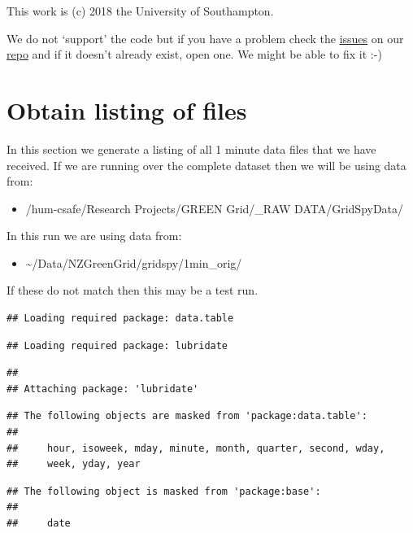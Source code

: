 \documentclass[]{article}
\providecommand{\tightlist}{%
  \setlength{\itemsep}{0pt}\setlength{\parskip}{0pt}}
\begin{document}
This work is (c) 2018 the University of Southampton.

We do not `support' the code but if you have a problem check the
\href{https://git.soton.ac.uk/ba1e12/nzGREENGrid/issues}{issues} on our
\href{https://git.soton.ac.uk/ba1e12/nzGREENGrid}{repo} and if it
doesn't already exist, open one. We might be able to fix it :-)

\section{Obtain listing of files}\label{obtain-listing-of-files}

In this section we generate a listing of all 1 minute data files that we
have received. If we are running over the complete dataset then we will
be using data from:

\begin{itemize}
\tightlist
\item
  /hum-csafe/Research Projects/GREEN Grid/\_RAW DATA/GridSpyData/
\end{itemize}

In this run we are using data from:

\begin{itemize}
\tightlist
\item
  \textasciitilde{}/Data/NZGreenGrid/gridspy/1min\_orig/
\end{itemize}

If these do not match then this may be a test run.

\begin{verbatim}
## Loading required package: data.table
\end{verbatim}

\begin{verbatim}
## Loading required package: lubridate
\end{verbatim}

\begin{verbatim}
## 
## Attaching package: 'lubridate'
\end{verbatim}

\begin{verbatim}
## The following objects are masked from 'package:data.table':
## 
##     hour, isoweek, mday, minute, month, quarter, second, wday,
##     week, yday, year
\end{verbatim}

\begin{verbatim}
## The following object is masked from 'package:base':
## 
##     date
\end{verbatim}
\end{document}

